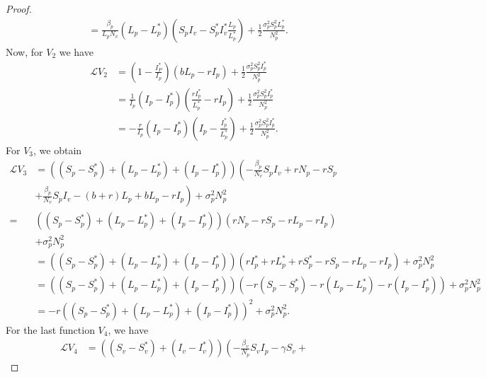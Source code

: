 \begin{proof}
\begin{align*}
			&=
				\frac{\beta_p}{L_pN_v}
				\left(
					L_p - L_p^*
				\right)
				\left(
					S_pI_v - S_p ^ *I_v^*
					\frac{L_p}{L_p^*}
				\right) + 
				\frac{1}{2}
				\frac{\sigma_p^2 S_p^2 L_p^*}{N_p^2}.
	\end{align*}
%
Now, for $V_2$ we have
%
	\begin{align*}
		\mathcal{L}V_2 
			&= 
				\left(
					1 - 
					\frac{I_P^*}{I_p}
				\right)
				\left(
					bL_p - r I_p 
				\right) + 
				\frac{1}{2}
				\frac{\sigma_p^2 S_p^2 I_p^*}{N_p^2}
			\\
			&= 
				\frac{1}{I_p}
				(I_p-I_p^*)
				\left(
					\frac{rI_p^*}{L_p^*} - 
					rI_p
				\right) + 
				\frac{1}{2}
				\frac{\sigma_p^2 S_p^2 I_p^*}{N_p^2}
			\\
			&=
				-\frac{r}{I_p} (I_p - I_p ^ *)
				\left(I_p - \frac{I_p ^* }{L_p^*}
				\right) + 
				\frac{1}{2} 
				\frac{\sigma_p^2 S_p^2 I_p ^ *}{N_p^2}.
	\end{align*}
	For $V_3$, we obtain
	\begin{align*}
		\mathcal{L}V_3
			&= 
				\left(
					(S_p - S_p ^* ) + 
					(L_p - L_p ^* ) +
					(I_p - I_p ^*)
				\right)
				\left(
					-\frac{\beta_p}{N_v}S_pI_v + 
					r N_p - rS_p 
				\right.\\
			&+
				\left.
					\frac{\beta_p}{N_v} 
					S_pI_v - (b+r)L_p + bL_p-rI_p
				\right) + 
				\sigma_p^2N_p^2
				\\
			= &
				\left(
					(S_p - S_p^*) + 
					(L_p - L_p^*) + 
					(I_p - I_p^*)
				\right)
				( r N_p - r S_p - r L_p - r I_p)
			\\
				& +
				\sigma_p^2N_p^2
			\\
			&=
				\left(
					(S_p - S_p ^*) + 
					(L_p - L_p ^*) + 
					(I_p - I_p^*)
				\right)
				( r I_p ^* + r L_p^* + rS_p^* - rS_p - r L_p-r I_p) + 
				\sigma_p^2 N_p^2
			\\
			&=
				\left(
					(S_p - S_p ^*) + 
					(L_p - L_p ^*) +
					(I_p - I_p ^*)
				\right)
				(
					-r (S_p - S_p ^*) -
					r (L_p - L_p^*) - 
					r(I_p-I_p^*)
				) + 
				\sigma_p^2 N_p^2
			\\
			&=
				-r
				\left(
					(S_p - S_p ^*) + 
					(L_p - L_p ^*) +
					(I_p - I_p^*)
				\right) ^ 2 + 
				\sigma_p^2 N_p^2.
	\end{align*}
	For the last function $V_4$, we have
	\begin{align*}
		\mathcal{L}V_4
			&= 
				\left(
					(S_v - S_v ^*) + 
					(I_v - I_v ^*)
				\right)
				\left( - 
					\frac{\beta_v}{N_p} S_vI_p -
					\gamma S_v + 

\end{align*}
\end{proof}

